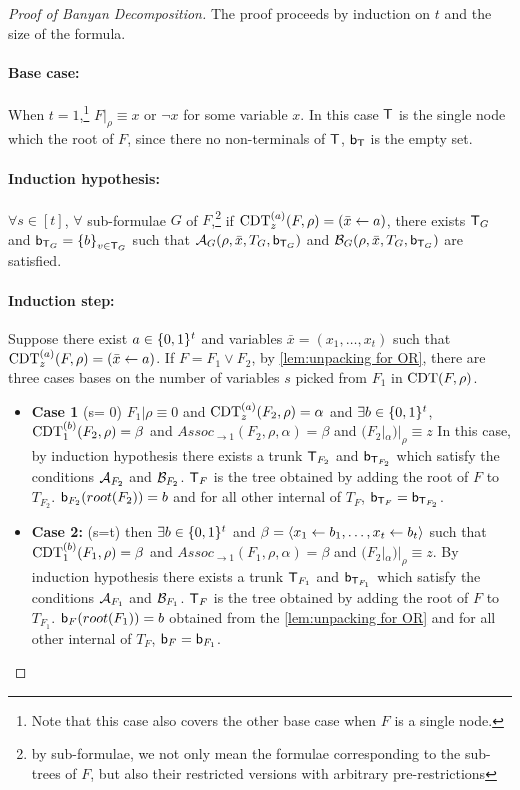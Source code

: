  
\begin{proof}[Proof of Banyan Decomposition]
The proof proceeds by induction on $t$ and the size of the formula. 
\paragraph{Base case:}
When $t=1$,\footnote{Note that this case also covers the other base case \ie when $F$ is a single node.} $F|_{\rho} \equiv x$ or $\neg x$ for some variable $x$. In this case $\mathsf{T}$ is the single node which the root of $F$, since there no non-terminals of $\mathsf{T}$, $\mathsf{b_T}$ is the empty set.    

\paragraph{Induction hypothesis:} $\forall s\in [t]$, $\forall$ sub-formulae $G$ of $F$,\footnote{by sub-formulae, we not only mean the formulae corresponding to the sub-trees of $F$, but also their restricted versions with arbitrary pre-restrictions} if $\operatorname{CDT}^{(a)}_z(F,\rho) = (\bar{x} \gets a)$, 
there exists $\mathsf{T}_G$ and $\mathsf{b}_{\mathsf{T}_G}= \left\{ b \right\}_{v \in \mathsf{T}_G}$  such that $\mathcal{A}_G(\rho,\bar{x}, T_G, \mathsf{b}_{\mathsf{T}_G})$
and $\mathcal{B}_G(\rho,\bar{x}, T_G, \mathsf{b}_{\mathsf{T}_G})$ are satisfied.

\paragraph{Induction step:} 
Suppose there exist $a \in \{0,1\}^t$ and variables $\bar{x}= (x_1, \dots ,x_t)$ such that $\operatorname{CDT}^{(a)}_z(F,\rho) = (\bar{x} \gets a)$. 
If $F = F_1 \vee F_2$, by \cref{lem:unpacking for OR}, there are three cases bases on the number of variables $s$ picked from $F_1$ in $\operatorname{CDT}(F,\rho)$.

\begin{itemize}
    \item \textbf{Case 1} (s= 0) $F_1|\rho \equiv 0$ and $\operatorname{CDT}^{(a)}_z(F_2,\rho) = \alpha$ and $\exists b \in \{0,1\}^t$, $\operatorname{CDT}^{(b)}_1(F_2,\rho) = \beta$ and $Assoc_{\to 1}(F_2, \rho , \alpha) = \beta$ and $(F_2|_\alpha)|_{\rho} \equiv z$
    In this case, by induction hypothesis there exists a trunk $\mathsf{T}_{F_2}$ and $\mathsf{b}_{\mathsf{T}_{F_2}}$ which satisfy the conditions $\mathcal{A}_{F_2}$ and $\mathcal{B}_{F_2}$. 
    $\mathsf{T}_F$ is the tree obtained by adding the root of $F$ to $T_{F_2}$. $\mathsf{b}_{F_2}(root(F_2)) = b$ and for all other internal of $T_F$,  $\mathsf{b}_{\mathsf{T}_F} = \mathsf{b}_{\mathsf{T}_{F_2}}$. 

    \item \textbf{Case 2:} (s=t)
   then $\exists b \in \{0,1\}^t$ and $\beta = \left\langle x_1 \gets b_1, \dots , x_t \gets b_t \right\rangle$ such that $\operatorname{CDT}^{(b)}_1(F_1,\rho) = \beta$ and $Assoc_{\to 1}(F_1, \rho , \alpha) = \beta$ and $(F_2|_\alpha)|_{\rho} \equiv z$. 
    By induction hypothesis there exists a trunk $\mathsf{T}_{F_1}$ and $\mathsf{b}_{\mathsf{T}_{F_1}}$ which satisfy the conditions $\mathcal{A}_{F_1}$ and $\mathcal{B}_{F_1}$. 
    $\mathsf{T}_F$ is the tree obtained by adding the root of $F$ to $T_{F_1}$. $\mathsf{b}_F(root(F_1)) = b$ obtained from the \cref{lem:unpacking for OR} and for all other internal of $T_F$, $\mathsf{b}_F = \mathsf{b}_{F_1}$.


\end{itemize}
\end{proof}
